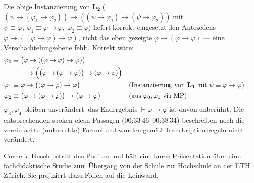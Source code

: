 \begin{ai-note}
Die obige Instanziierung von $\mathbf{L_2}$ ($(\psi\rightarrow(\varphi_1\rightarrow\varphi_2))\rightarrow((\psi\rightarrow\varphi_1)\rightarrow(\psi\rightarrow\varphi_2))$ mit $\psi\equiv\varphi,\ \varphi_1\equiv\varphi\to\varphi,\ \varphi_2\equiv\varphi$) liefert korrekt eingesetzt den Antezedens $\varphi\to((\varphi\to\varphi)\to\varphi)$, nicht das oben gezeigte $\varphi\to(\varphi\to\varphi)$ --- eine Verschachtelungsebene fehlt. Korrekt wäre:
\begin{align*}
\varphi_0 &\equiv \bigl(\varphi \rightarrow ((\varphi \rightarrow \varphi) \rightarrow \varphi)\bigr) \\
&\qquad \rightarrow \Bigl(\bigl(\varphi \rightarrow (\varphi \rightarrow \varphi)\bigr) \rightarrow (\varphi \rightarrow \varphi)\Bigr) \\
\varphi_1 &\equiv \varphi \rightarrow \bigl((\varphi \rightarrow \varphi) \rightarrow \varphi\bigr) && \text{(Instanziierung von $\mathbf{L_1}$ mit $\psi\equiv\varphi\to\varphi$)} \\
\varphi_2 &\equiv \bigl(\varphi \rightarrow (\varphi \rightarrow \varphi)\bigr) \rightarrow \bigl(\varphi \rightarrow \varphi\bigr) && \text{(aus $\varphi_0,\varphi_1$ via MP)}
\end{align*}
$\varphi_3,\varphi_4$ bleiben unverändert; das Endergebnis $\vdash\varphi\to\varphi$ ist davon unberührt. Die entsprechenden spoken-clean-Passagen (00:33:46--00:38:34) beschreiben noch die vereinfachte (unkorrekte) Formel und wurden gemäß Transkriptionsregeln nicht verändert.
\end{ai-note}

\begin{meta-note}
Cornelia Busch betritt das Podium und hält eine kurze Präsentation über eine fachdidaktische Studie zum Übergang von der Schule zur Hochschule an der ETH Zürich. Sie projiziert dazu Folien auf die Leinwand.
\end{meta-note}

